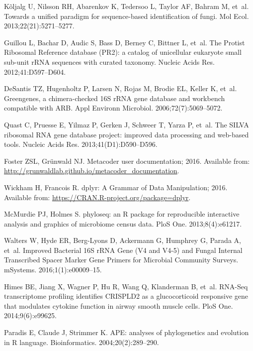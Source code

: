 \documentclass[10pt,letterpaper]{article}
\begin{document}
\begin{thebibliography}{10}
	K{\~o}ljalg U, Nilsson RH, Abarenkov K, Tedersoo L, Taylor AF, Bahram M, et~al.
	\newblock Towards a unified paradigm for sequence-based identification of
	fungi.
	\newblock Mol Ecol. 2013;22(21):5271--5277.
	
	Guillou L, Bachar D, Audic S, Bass D, Berney C, Bittner L, et~al.
	\newblock The Protist Ribosomal Reference database (PR2): a catalog of
	unicellular eukaryote small sub-unit rRNA sequences with curated taxonomy.
	\newblock Nucleic Acids Res. 2012;41:D597--D604.
	
	DeSantis TZ, Hugenholtz P, Larsen N, Rojas M, Brodie EL, Keller K, et~al.
	\newblock Greengenes, a chimera-checked 16S rRNA gene database and workbench
	compatible with ARB.
	\newblock Appl Environn Microbiol. 2006;72(7):5069--5072.
	
	Quast C, Pruesse E, Yilmaz P, Gerken J, Schweer T, Yarza P, et~al.
	\newblock The SILVA ribosomal RNA gene database project: improved data
	processing and web-based tools.
	\newblock Nucleic Acids Res. 2013;41(D1):D590--D596.
	
	Foster ZSL, Gr{\"u}nwald NJ. Metacoder user documentation; 2016.
	\newblock Available from:
	\url{http://grunwaldlab.github.io/metacoder_documentation}.
	
	Wickham H, Francois R. dplyr: A Grammar of Data Manipulation; 2016.
	\newblock Available from: \url{https://CRAN.R-project.org/package=dplyr}.
	
	McMurdie PJ, Holmes S.
	\newblock phyloseq: an R package for reproducible interactive analysis and
	graphics of microbiome census data.
	\newblock PloS One. 2013;8(4):e61217.
	
	Walters W, Hyde ER, Berg-Lyons D, Ackermann G, Humphrey G, Parada A, et~al.
	\newblock Improved Bacterial 16S rRNA Gene (V4 and V4-5) and Fungal Internal
	Transcribed Spacer Marker Gene Primers for Microbial Community Surveys.
	\newblock mSystems. 2016;1(1):e00009--15.
	
	Himes BE, Jiang X, Wagner P, Hu R, Wang Q, Klanderman B, et~al.
	\newblock RNA-Seq transcriptome profiling identifies CRISPLD2 as a
	glucocorticoid responsive gene that modulates cytokine function in airway
	smooth muscle cells.
	\newblock PloS One. 2014;9(6):e99625.
	
	Paradis E, Claude J, Strimmer K.
	\newblock APE: analyses of phylogenetics and evolution in R language.
	\newblock Bioinformatics. 2004;20(2):289--290.
	

\end{thebibliography}
\end{document}
